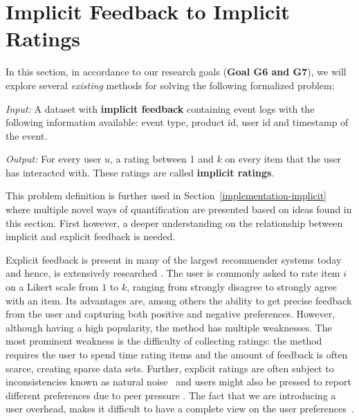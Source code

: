 
\clearpage

\section{Implicit Feedback to Implicit Ratings}
\label{sec:implicit}

In this section, in accordance to our research goals (\textbf{Goal G6 and G7}),
we will explore several \textit{existing} methods for solving the following
formalized problem:

\vspace{5 mm}

\noindent \textit{Input:} A dataset with \textbf{implicit feedback} containing event logs
with the following information available: event type, product id, user id and
timestamp of the event.

\vspace{3 mm}

\noindent \textit{Output:} For every user $u$, a rating between 1 and $k$ on every item that
the user has interacted with. These ratings are called \textbf{implicit
ratings}.

\vspace{5 mm}

This problem definition is further used in
Section~\ref{implementation-implicit} where multiple novel ways of
quantification are presented based on ideas found in this section. First
however, a deeper understanding on the relationship between implicit and
explicit feedback is needed.

Explicit feedback is present in many of the largest recommender systems today
and hence, is extensively researched \cite{Adomavicius2005}. The user is
commonly asked to rate item $i$ on a Likert scale from $1$ to $k$, ranging from
strongly disagree to strongly agree with an item. Its advantages are, among
others the ability to get precise feedback from the user and capturing both
positive and negative preferences. However, although having a high popularity,
the method has multiple weaknesses. The most prominent weakness is the
difficulty of collecting ratings: the method requires the user to spend time
rating items and the amount of feedback is often scarce, creating sparse data
sets. Further, explicit ratings are often subject to inconsistencies known as
natural noise~\cite{amatriain2009like} and users might also be pressed to
report different preferences due to peer pressure \cite{bell2007scalable}. The
fact that we are introducing a user overhead, makes it difficult to have a
complete view on the user preferences~\cite{Jawaheer2010}.

